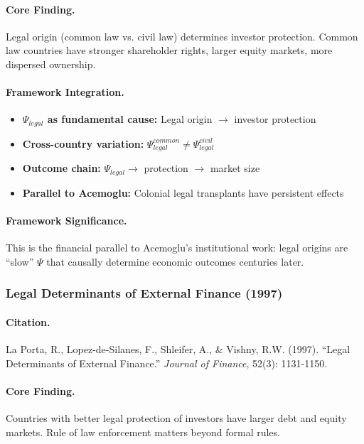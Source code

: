 \documentclass[12pt,a4paper]{article}
\begin{document}
\paragraph{Core Finding.}
Legal origin (common law vs. civil law) determines investor protection.
Common law countries have stronger shareholder rights, larger equity markets,
more dispersed ownership.

\paragraph{Framework Integration.}
\begin{itemize}
  \item \textbf{$\Psi_{legal}$ as fundamental cause:} Legal origin $\to$ investor protection
  \item \textbf{Cross-country variation:} $\Psi_{legal}^{common} \neq \Psi_{legal}^{civil}$
  \item \textbf{Outcome chain:} $\Psi_{legal} \to$ protection $\to$ market size
  \item \textbf{Parallel to Acemoglu:} Colonial legal transplants have persistent effects
\end{itemize}

\paragraph{Framework Significance.}
This is the financial parallel to Acemoglu's institutional work: legal origins
are ``slow'' $\Psi$ that causally determine economic outcomes centuries later.

\subsubsection{Legal Determinants of External Finance (1997)}

\paragraph{Citation.}
La Porta, R., Lopez-de-Silanes, F., Shleifer, A., \& Vishny, R.W. (1997).
``Legal Determinants of External Finance.'' \emph{Journal of Finance}, 52(3): 1131-1150.

\paragraph{Core Finding.}
Countries with better legal protection of investors have larger debt and
equity markets. Rule of law enforcement matters beyond formal rules.
\end{document}
